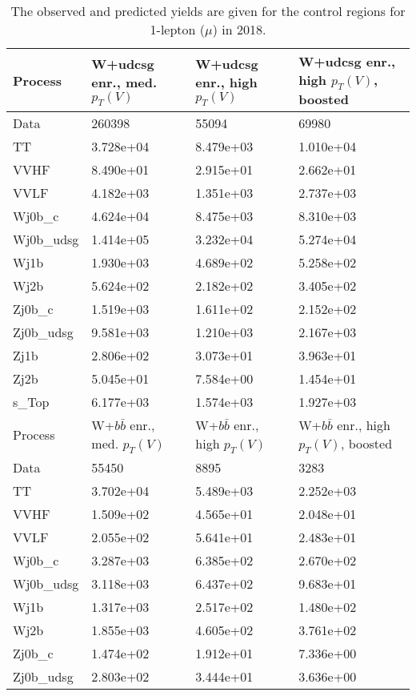 \begin{table}
\centering
\caption[2018 1-lepton ($\mu$) control region yields]{
                  The observed and predicted yields are given for the
                  control regions for 1-lepton ($\mu$) in 2018.
                  }
{\footnotesize
\begin{tabularx}{0.8\textwidth}{|X|X|X|X|}
\hline
Process & W+udcsg enr., med. $p_{T}(V)$ & W+udcsg enr., high $p_{T}(V)$ & W+udcsg enr., high $p_{T}(V)$, boosted \\
\hline
Data & 260398 & 55094 & 69980 \\
\hline
TT & 3.728e+04 & 8.479e+03 & 1.010e+04 \\
VVHF & 8.490e+01 & 2.915e+01 & 2.662e+01 \\
VVLF & 4.182e+03 & 1.351e+03 & 2.737e+03 \\
Wj0b\_c & 4.624e+04 & 8.475e+03 & 8.310e+03 \\
Wj0b\_udsg & 1.414e+05 & 3.232e+04 & 5.274e+04 \\
Wj1b & 1.930e+03 & 4.689e+02 & 5.258e+02 \\
Wj2b & 5.624e+02 & 2.182e+02 & 3.405e+02 \\
Zj0b\_c & 1.519e+03 & 1.611e+02 & 2.152e+02 \\
Zj0b\_udsg & 9.581e+03 & 1.210e+03 & 2.167e+03 \\
Zj1b & 2.806e+02 & 3.073e+01 & 3.963e+01 \\
Zj2b & 5.045e+01 & 7.584e+00 & 1.454e+01 \\
s\_Top & 6.177e+03 & 1.574e+03 & 1.927e+03 \\
\hline
\hline
Process & W+$b\bar{b}$ enr., med. $p_{T}(V)$ & W+$b\bar{b}$ enr., high $p_{T}(V)$ & W+$b\bar{b}$ enr., high $p_{T}(V)$, boosted \\
\hline
Data & 55450 & 8895 & 3283 \\
\hline
TT & 3.702e+04 & 5.489e+03 & 2.252e+03 \\
VVHF & 1.509e+02 & 4.565e+01 & 2.048e+01 \\
VVLF & 2.055e+02 & 5.641e+01 & 2.483e+01 \\
Wj0b\_c & 3.287e+03 & 6.385e+02 & 2.670e+02 \\
Wj0b\_udsg & 3.118e+03 & 6.437e+02 & 9.683e+01 \\
Wj1b & 1.317e+03 & 2.517e+02 & 1.480e+02 \\
Wj2b & 1.855e+03 & 4.605e+02 & 3.761e+02 \\
Zj0b\_c & 1.474e+02 & 1.912e+01 & 7.336e+00 \\
Zj0b\_udsg & 2.803e+02 & 3.444e+01 & 3.636e+00 \\

\end{tabularx}}
\end{table}
